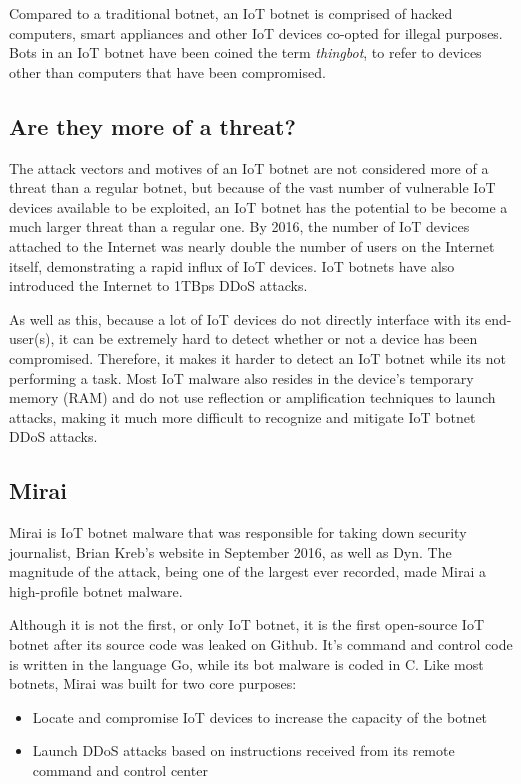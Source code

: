 Compared to a traditional botnet, an IoT botnet is comprised of hacked computers, smart appliances and other IoT devices co-opted for illegal purposes. Bots in an IoT botnet have been coined the term \textit{thingbot}\textsuperscript{\cite{thingbots}}, to refer to devices other than computers that have been compromised.

\subsection{Are they more of a threat?}

The attack vectors and motives of an IoT botnet are not considered more of a threat than a regular botnet, but because of the vast number of vulnerable IoT devices available to be exploited, an IoT botnet has the potential to be become a much larger threat than a regular one.
By 2016, the number of IoT devices attached to the Internet was nearly double the number of users on the Internet itself, demonstrating a rapid influx of IoT devices. IoT botnets have also introduced the Internet to 1TBps DDoS attacks.

\vspace{0.5cm}

As well as this, because a lot of IoT devices do not directly interface with its end-user(s), it can be extremely hard to detect whether or not a device has been compromised. Therefore, it makes it harder to detect an IoT botnet while its not performing a task. Most IoT malware also resides in the device's temporary memory (RAM) and do not use reflection or amplification techniques to launch attacks, making it much more difficult to recognize and mitigate IoT botnet DDoS attacks\textsuperscript{\cite{angrishi2017turning}}.

\subsection{Mirai}

Mirai is IoT botnet malware that was responsible for taking down security journalist, Brian Kreb's website in September 2016, as well as Dyn\textsuperscript{\cite{aprilunderstanding}}. The magnitude of the attack, being one of the largest ever recorded, made Mirai a high-profile botnet malware.

Although it is not the first, or only IoT botnet, it is the first open-source IoT botnet after its source code was leaked on Github. It's command and control code is written in the language Go, while its bot malware is coded in C. Like most botnets, Mirai was built for two core purposes\textsuperscript{\cite{incapsulamirai}}:
\begin{itemize}
	\item{Locate and compromise IoT devices to increase the capacity of the botnet}
	\item{Launch DDoS attacks based on instructions received from its remote command and control center}
\end{itemize}

